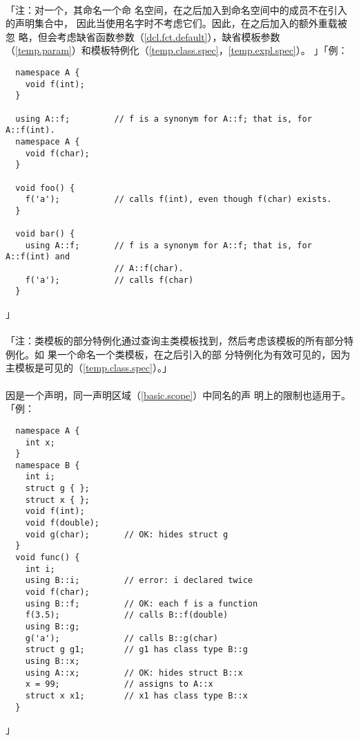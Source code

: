 \paragraph{}
「注：对一个，其命名一个命
名空间，在之后加入到命名空间中的成员不在引入的声明集合中，
因此当使用名字时不考虑它们。因此，在之后加入的额外重载被忽
略，但会考虑缺省函数参数（\ref{dcl.fct.default}），缺省模板参数
（\ref{temp.param}）和模板特例化（\ref{temp.class.spec}，\ref{temp.expl.spec}）。
」「例：
\begin{lstlisting}
  namespace A {
    void f(int);
  }

  using A::f;         // f is a synonym for A::f; that is, for A::f(int).
  namespace A {
    void f(char);
  }

  void foo() {
    f('a');           // calls f(int), even though f(char) exists.
  }

  void bar() {
    using A::f;       // f is a synonym for A::f; that is, for A::f(int) and
                      // A::f(char).
    f('a');           // calls f(char)  
  }
\end{lstlisting}」

\paragraph{}
「注：类模板的部分特例化通过查询主类模板找到，然后考虑该模板的所有部分特例化。如
果一个命名一个类模板，在之后引入的部
分特例化为有效可见的，因为主模板是可见的（\ref{temp.class.spec}）。」

\paragraph{}
因是一个声明，同一声明区域（\ref{basic.scope}）中同名的声
明上的限制也适用于。「例：
\begin{lstlisting}
  namespace A {
    int x;
  }
  namespace B {
    int i;
    struct g { };
    struct x { };
    void f(int);
    void f(double);
    void g(char);       // OK: hides struct g
  }
  void func() {
    int i;
    using B::i;         // error: i declared twice
    void f(char);
    using B::f;         // OK: each f is a function
    f(3.5);             // calls B::f(double)
    using B::g;
    g('a');             // calls B::g(char)
    struct g g1;        // g1 has class type B::g
    using B::x;
    using A::x;         // OK: hides struct B::x
    x = 99;             // assigns to A::x
    struct x x1;        // x1 has class type B::x
  }
\end{lstlisting}」

